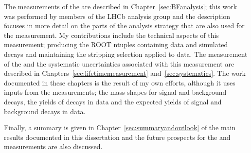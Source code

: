 The measurements of the \bmumu \BFs are described in Chapter~\ref{sec:BFanalysis}; this work was performed by members of the \bmumu LHCb analysis group and the description focuses in more detail on the parts of the analysis strategy that are also used for the \el measurement. My contributions include the technical aspects of this measurement; producing the ROOT ntuples containing data and simulated decays and maintaining the stripping selection applied to data. 
The measurement of the \bsmumu \el and the systematic uncertainties associated with this measurement are described in Chapters~\ref{sec:lifetimemeasurement} and~\ref{sec:systematics}. 
The work documented in these chapters is the result of my own efforts, although it uses inputs from the \BF measurements; the mass shapes for signal and background decays, the yields of \bsjpsiphi decays in data and the expected yields of signal and background decays in data. %

Finally, a summary is given in Chapter~\ref{sec:summaryandoutlook} of the main results documented in this dissertation and the future prospects for the \BF and \el measurements are also discussed. 

